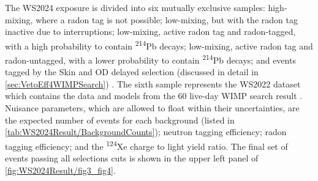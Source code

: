 The WS2024 exposure is divided into six mutually exclusive samples: high-mixing, where a radon tag is not possible; low-mixing, but with the radon tag inactive due to interruptions; low-mixing, active radon tag and radon-tagged, with a high probability to contain \textsuperscript{214}Pb decays; low-mixing, active radon tag and radon-untagged, with a lower probability to contain \textsuperscript{214}Pb decays; and events tagged by the Skin and OD delayed selection (discussed in detail in \autoref{sec:VetoEff4WIMPSearch}) \cite{LZCollaboration:2024lux}. The sixth sample represents the WS2022 dataset which contains the data and models from the 60 live-day WIMP search result \cite{LZ:2022lsv}. Nuisance parameters, which are allowed to float within their uncertainties, are the expected number of events for each background (listed in \autoref{tab:WS2024Result/BackgroundCounts}); neutron tagging efficiency; radon tagging efficiency; and the \textsuperscript{124}Xe charge to light yield ratio. The final set of events passing all selections cuts is shown in the upper left panel of \autoref{fig:WS2024Result/fig3_fig4}.

